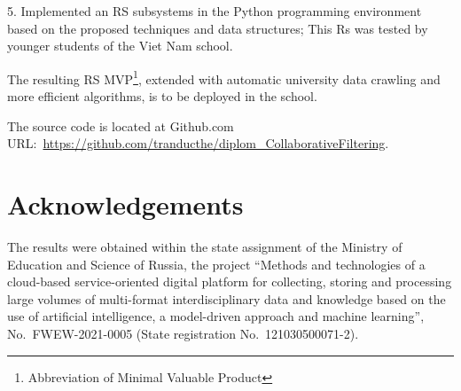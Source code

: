 \documentclass[conference,a4]{IEEEtran}
\begin{document}
5. Implemented an RS subsystems in the Python programming environment based on the proposed techniques and data structures; This Rs was tested by younger students of the Viet Nam school.

The resulting RS MVP\footnote{Abbreviation of Minimal Valuable Product}, extended with automatic university data crawling and more efficient algorithms, is to be deployed in the school.

The source code is located at Github.com URL:~\url{https://github.com/tranducthe/diplom_CollaborativeFiltering}.


\section*{Acknowledgements}
\label{sec:ack}

The results were obtained within the state assignment of the Ministry of Education and Science of Russia, the project ``Methods and technologies of a cloud-based service-oriented digital platform for collecting, storing and processing large volumes of multi-format interdisciplinary data and knowledge based on the use of artificial intelligence, a model-driven approach and machine learning'', No.~FWEW-2021-0005 (State registration No.~121030500071-2).


\end{document}
